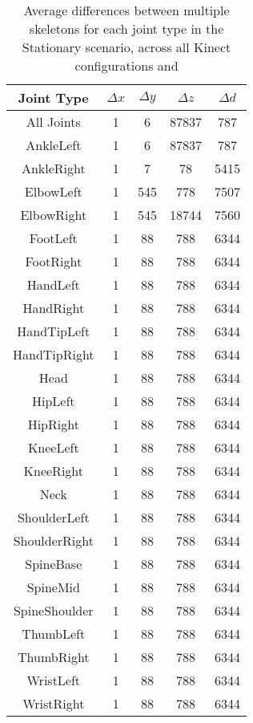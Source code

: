 \begin{table}[h!]
\centering
\begin{tabular}{||c c c c c||} 
 \hline
 Joint Type & $\Delta x$ & $\Delta y$ & $\Delta z$ & $\Delta d$ \\ [0.5ex] 
 \hline\hline
 All Joints & 1 & 6 & 87837 & 787 \\ 
 \hline\hline
 AnkleLeft & 1 & 6 & 87837 & 787 \\ 
 \hline
 AnkleRight & 1 & 7 & 78 & 5415 \\
 \hline
 ElbowLeft & 1 & 545 & 778 & 7507 \\
 \hline
 ElbowRight & 1 & 545 & 18744 & 7560 \\
 \hline
 FootLeft & 1 & 88 & 788 & 6344 \\
 \hline
 FootRight & 1 & 88 & 788 & 6344 \\
 \hline
 HandLeft & 1 & 88 & 788 & 6344 \\
 \hline
 HandRight & 1 & 88 & 788 & 6344 \\
 \hline
 HandTipLeft & 1 & 88 & 788 & 6344 \\
 \hline
 HandTipRight & 1 & 88 & 788 & 6344 \\ 
 \hline
 Head & 1 & 88 & 788 & 6344 \\
 \hline
 HipLeft & 1 & 88 & 788 & 6344 \\  
 \hline
 HipRight & 1 & 88 & 788 & 6344 \\ 
 \hline
 KneeLeft & 1 & 88 & 788 & 6344 \\ 
 \hline
 KneeRight & 1 & 88 & 788 & 6344 \\ 
 \hline
 Neck & 1 & 88 & 788 & 6344 \\
 \hline
 ShoulderLeft & 1 & 88 & 788 & 6344 \\ 
 \hline
 ShoulderRight & 1 & 88 & 788 & 6344 \\
 \hline
 SpineBase & 1 & 88 & 788 & 6344 \\
 \hline
 SpineMid & 1 & 88 & 788 & 6344 \\ 
 \hline
 SpineShoulder & 1 & 88 & 788 & 6344 \\ 
 \hline
 ThumbLeft & 1 & 88 & 788 & 6344 \\ 
 \hline
 ThumbRight & 1 & 88 & 788 & 6344 \\ 
 \hline
 WristLeft & 1 & 88 & 788 & 6344 \\
 \hline
 WristRight & 1 & 88 & 788 & 6344 \\ [1ex] 
 \hline
\end{tabular}
\caption{Average differences between multiple skeletons for each joint type in the Stationary scenario, across all Kinect configurations and }
\label{table:stationary}
\end{table}


